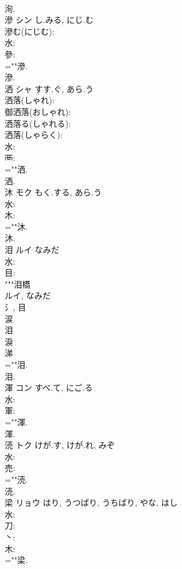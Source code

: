 \documentclass[8pt]{extreport}
\begin{document}
\begin{CJK}{UTF8}{min}
\\	洵.
\\	滲	シン	し.みる, にじ.む		
\\	滲む(にじむ): 
\\	水: 
\\	參: 
\\	=""滲.
\\	滲.
\\	洒	シャ	すす.ぐ, あら.う		
\\	洒落(しゃれ): 
\\	御洒落(おしゃれ): 
\\	洒落る(しゃれる): 
\\	洒落(しゃらく): 
\\	水: 
\\	襾: 
\\	=""洒.
\\	洒.
\\	沐	モク	もく.する, あら.う		
\\	水: 
\\	木: 
\\	=""沐.
\\	沐.
\\	泪	ルイ	なみだ				
\\	水: 
\\	目: 
\\	"""泪橋 
\\	ルイ, なみだ 
\\	氵, 目 
\\	涙
\\	泪
\\	淚 
\\	涕 
\\	=""泪.
\\	泪.
\\	渾	コン	すべ.て, にご.る		
\\	水: 
\\	軍: 
\\	=""渾.
\\	渾.
\\	涜	トク	けが.す, けが.れ, みぞ		
\\	水: 
\\	売: 
\\	=""涜.
\\	涜.
\\	梁	リョウ	はり, うつばり, うちばり, やな, はし		
\\	水: 
\\	刀: 
\\	丶: 
\\	木: 
\\	=""梁.

\end{CJK}
\end{document}
